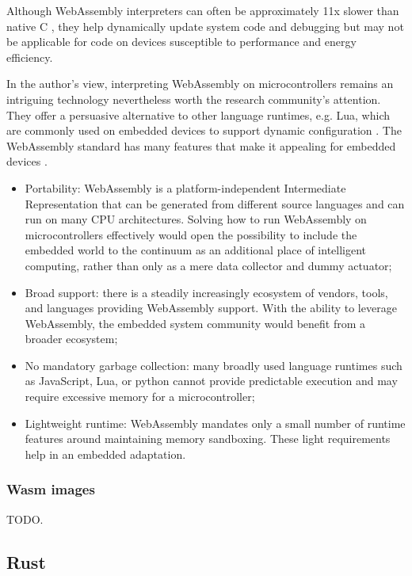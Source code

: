 Although WebAssembly interpreters can often be approximately 11x slower than native C \cite{wasm3-performance}, they help dynamically update system code and debugging but may not be applicable for code on devices susceptible to performance and energy efficiency.

In the author's view, interpreting WebAssembly on microcontrollers remains an intriguing technology nevertheless worth the research community's attention. They offer a persuasive alternative to other language runtimes, e.g. Lua, which are commonly used on embedded devices to support dynamic configuration \cite{brzoza2016embedded}. The WebAssembly standard has many features that make it appealing for embedded devices \cite{peach2020ewasm}.

\begin{itemize}
    \item Portability: WebAssembly is a platform-independent Intermediate Representation that can be generated from different source languages and can run on many CPU architectures. Solving how to run WebAssembly on microcontrollers effectively would open the possibility to include the embedded world to the continuum as an additional place of intelligent computing, rather than only as a mere data collector and dummy actuator;
    \item Broad support: there is a steadily increasingly ecosystem of vendors, tools, and languages providing WebAssembly support. With the ability to leverage WebAssembly, the embedded system community would benefit from a broader ecosystem;
    \item No mandatory garbage collection: many broadly used language runtimes such as JavaScript, Lua, or python cannot provide predictable execution and may require excessive memory for a microcontroller;
    \item Lightweight runtime: WebAssembly mandates only a small number of runtime features around maintaining memory sandboxing. These light requirements help in an embedded adaptation.
\end{itemize}

\subsubsection{Wasm images}

TODO.

\subsection{Rust}
\label{sec:rust}

